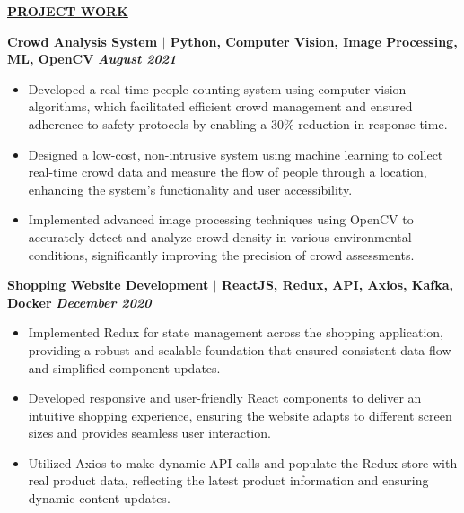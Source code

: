 \documentclass{article}
\begin{document}
\vspace{2mm}
\noindent \textbf{\underline{PROJECT WORK}} 

\noindent \textbf{Crowd Analysis System $\mid$ Python, Computer Vision, Image Processing, ML, OpenCV} \textit{\hfill \textbf{August 2021}}
\begin{itemize}[noitemsep,nolistsep,leftmargin=*]
  \item {\small Developed a real-time people counting system using computer vision algorithms, which facilitated efficient crowd management and ensured adherence to safety protocols by enabling a 30\% reduction in response time.}
  \item {\small Designed a low-cost, non-intrusive system using machine learning to collect real-time crowd data and measure the flow of people through a location, enhancing the system's functionality and user accessibility.}
  \item {\small Implemented advanced image processing techniques using OpenCV to accurately detect and analyze crowd density in various environmental conditions, significantly improving the precision of crowd assessments.}
\end{itemize}
\vspace{1mm} 

\noindent \textbf{Shopping Website Development $\mid$ ReactJS, Redux, API, Axios, Kafka, Docker} \textit{\hfill \textbf{December 2020}} 
\begin{itemize}[noitemsep,nolistsep,leftmargin=*]
  \item {\small Implemented Redux for state management across the shopping application, providing a robust and scalable foundation that ensured consistent data flow and simplified component updates.}
  \item {\small Developed responsive and user-friendly React components to deliver an intuitive shopping experience, ensuring the website adapts to different screen sizes and provides seamless user interaction.}
  \item {\small Utilized Axios to make dynamic API calls and populate the Redux store with real product data, reflecting the latest product information and ensuring dynamic content updates.}
\end{itemize}
\vspace{1mm} 
\end{document}
